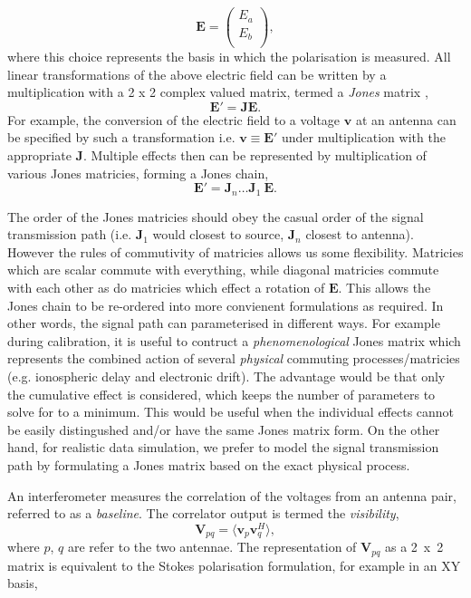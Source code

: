 \begin{equation*}
\bm{E} = \left(
\begin{array}{c}
E_a \\
E_b \\
\end{array} \right),
\end{equation*}
\noindent where this choice represents the basis in which the polarisation is measured. All linear transformations of the above electric field can be written by a multiplication with a 2 x 2 complex valued matrix, termed a \emph{Jones} matrix \citep{Jones_1941},
\begin{equation}
\bm{E'} = \bm{J E}.
\end{equation}
For example, the conversion of the electric field to a voltage $\bm{v}$ at an antenna can be specified by such a transformation i.e. $\bm{v} \equiv \bm{E'}$ under multiplication with the appropriate $\bm{J}$. Multiple effects then can be represented by multiplication of various Jones matricies, forming a Jones chain,
\begin{equation}
\bm{E'} = \bm{J}_n \ldots \bm{J}_1\ \bm{E}.
\end{equation}

The order of the Jones matricies should obey the casual order of the signal transmission path (i.e. $\bm{J}_1$ would closest to source, $\bm{J}_n$ closest to antenna). However the rules of commutivity of matricies allows us some flexibility. Matricies which are scalar commute with everything, while diagonal matricies commute with each other as do matricies which effect a rotation of $\bm{E}$. This allows the Jones chain to be re-ordered into more convienent formulations as required. In other words, the signal path can parameterised in different ways. For example during calibration, it is useful to contruct a \emph{phenomenological} Jones matrix which represents the combined action of several \emph{physical} commuting processes/matricies (e.g. ionospheric delay and electronic drift). The advantage would be that only the cumulative effect is considered, which keeps the number of parameters to solve for to a minimum. This would be useful when the individual effects cannot be easily distingushed and/or have the same Jones matrix form. On the other hand, for realistic data simulation, we prefer to model the signal transmission path by formulating a Jones matrix based on the exact physical process.


An interferometer measures the correlation of the voltages from an antenna pair, referred to as a  \emph{baseline}. The correlator output is termed the \emph{visibility}, 
\begin{equation}
\bm{V}_{pq} = \langle {\bm v}_p  {\bm v}_q^H \rangle,
\end{equation}
where $p$, $q$ are refer to the two antennae. The representation of  $\bm{V}_{pq}$ as a 2~x~2 matrix is equivalent to the Stokes polarisation formulation, for example in an XY basis,


